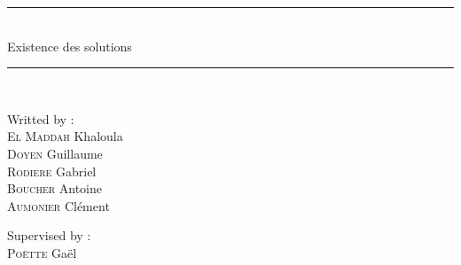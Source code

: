 \documentclass[onecolumn, 12pt, a4paper]{article}
\begin{document}
    \begin{center}


    \vspace{50pt}
    \vspace{20pt}
    
    \rule{1\textwidth}{2pt}\\
    \vspace{20pt}
    \huge Existence des solutions\\
    \vspace{20pt}
    \rule{1\textwidth}{2pt}\\ 
    \vspace{10pt}

    \end{center}

    \noindent
    \begin{minipage}{0.5\textwidth}
        \begin{flushleft}
            \Large Writted by :\\[0.2cm]
            \textsc{El Maddah} Khaloula\\
            \textsc{Doyen} Guillaume\\
            \textsc{Rodiere} Gabriel\\
            \textsc{Boucher} Antoine\\
            \textsc{Aumonier} Clément\\
        \end{flushleft}
    \end{minipage}%
    \begin{minipage}{0.5\textwidth}
        \begin{flushright}
                \Large Supervised by :\\[0.2cm]
                \textsc{Poëtte} Gaël\\

        \end{flushright}
    \end{minipage}
 
	\vspace{50 pt}
 


 

\newpage
\footnotesize

\tableofcontents
\setcounter{tocdepth}{1}
\setcounter{tocdepth}{0}
\def\restriction#1#2{\mathchoice
	{\setbox1\hbox{${\displaystyle #1}_{\scriptstyle #2}$}
		\restrictionaux{#1}{#2}}
	{\setbox1\hbox{${\textstyle #1}_{\scriptstyle #2}$}
		\restrictionaux{#1}{#2}}
	{\setbox1\hbox{${\scriptstyle #1}_{\scriptscriptstyle #2}$}
		\restrictionaux{#1}{#2}}
	{\setbox1\hbox{${\scriptscriptstyle #1}_{\scriptscriptstyle #2}$}
		\restrictionaux{#1}{#2}}}
\def\restrictionaux#1#2{{#1\,\smash{\vrule height .8\ht1 depth .85\dp1}}_{\,#2}} 
\end{document}
